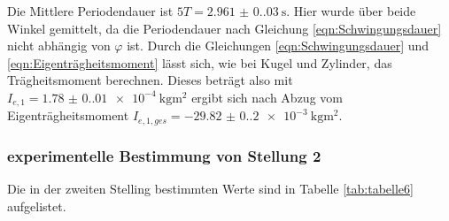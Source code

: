     Die Mittlere Periodendauer ist $5T=\qty{2.961(0.03)}{\second}$.
    Hier wurde über beide Winkel gemittelt, da die Periodendauer nach Gleichung \ref{eqn:Schwingungsdauer} nicht abhängig von $\varphi$ ist.
    Durch die Gleichungen \ref{eqn:Schwingungsdauer} und \ref{eqn:Eigenträgheitsmoment} lässt sich, wie bei Kugel und Zylinder, das Trägheitsmoment berechnen.
    Dieses beträgt also mit $I_{e,1}=\qty{1.78(0.01)e-4}{\kilo\gram\meter\squared}$ ergibt sich nach Abzug vom Eigenträgheitsmoment
    $I_{e,1,ges}=\qty{-29.82(0.20)e-3}{\kilo\gram\meter\squared}$.



    \subsubsection{experimentelle Bestimmung von Stellung 2}
    Die in der zweiten Stelling bestimmten Werte sind in Tabelle \ref{tab:tabelle6} aufgelistet.

